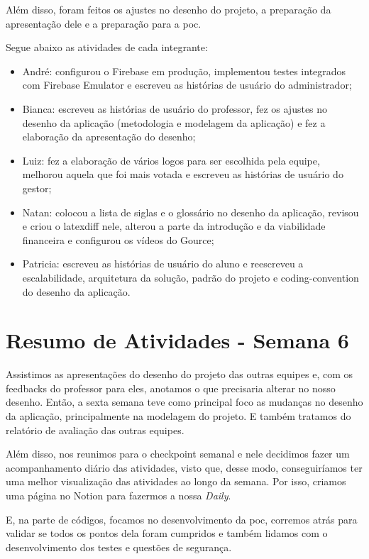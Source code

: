 \begin{apendicesenv}
Além disso, foram feitos os ajustes no desenho do projeto, a preparação da apresentação dele e a preparação para a \ac{poc}.

Segue abaixo as atividades de cada integrante:

\begin{itemize}
\item André: configurou o Firebase em produção, implementou testes integrados com Firebase Emulator e escreveu as histórias de usuário do administrador;
\item Bianca: escreveu as histórias de usuário do professor, fez os ajustes no desenho da aplicação (metodologia e modelagem da aplicação) e fez a elaboração da apresentação do desenho;
\item Luiz: fez a elaboração de vários logos para ser escolhida pela equipe, melhorou aquela que foi mais votada e escreveu as histórias de usuário do gestor;
\item Natan: colocou a lista de siglas e o glossário no desenho da aplicação, revisou e criou o latexdiff nele, alterou a parte da introdução e da viabilidade financeira e configurou os vídeos do Gource;
\item Patricia: escreveu as histórias de usuário do aluno e reescreveu a escalabilidade, arquitetura da solução, padrão do projeto e \gls{coding-convention} do desenho da aplicação.
\end{itemize}

\section{Resumo de Atividades - Semana 6}
Assistimos as apresentações do desenho do projeto das outras equipes e, com os \glspl{feedback} do professor para eles, anotamos o que precisaria alterar no nosso desenho. Então, a sexta semana teve como principal foco as mudanças no desenho da aplicação, principalmente na modelagem do projeto. E também tratamos do relatório de avaliação das outras equipes.

Além disso, nos reunimos para o \gls{checkpoint} semanal e nele decidimos fazer um acompanhamento diário das atividades, visto que, desse modo, conseguiríamos ter uma melhor visualização das atividades ao longo da semana. Por isso, criamos uma página no Notion para fazermos a nossa \textit{Daily}.

E, na parte de códigos, focamos no desenvolvimento da \ac{poc}, corremos atrás para validar se todos os pontos dela foram cumpridos e também lidamos com o desenvolvimento dos testes e questões de segurança.


\end{apendicesenv}
